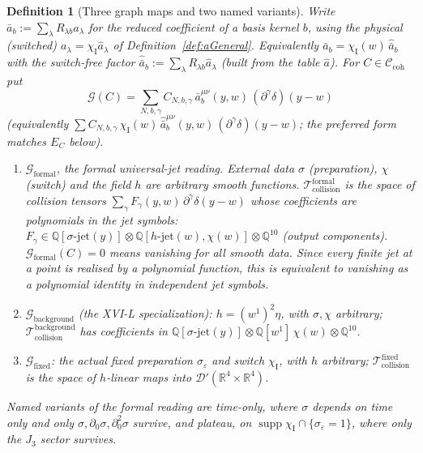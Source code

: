 \documentclass{article}
\newtheorem{definition}[proposition]{Definition}
\theoremstyle{remark}
\newcommand{\sigeps}{\sigma_\varepsilon}
\newcommand{\chiI}{\chi_{\mathrm I}}
\newcommand{\Ccoh}{\mathcal C_{\mathrm{coh}}}
\newcommand{\Tcol}{\mathcal T_{\mathrm{collision}}}
\begin{document}
\begin{definition}[Three graph maps and two named variants]
\label{def:Gmaps}
Write $\bar a_b:=\sum_\lambda R_{\lambda b}a_\lambda$ for the reduced coefficient of a basis kernel $b$, using the physical (switched) $a_\lambda=\chiI\hat a_\lambda$ of Definition~\ref{def:aGeneral}.
Equivalently $\bar a_b=\chiI(w)\,\hat{\bar a}_b$ with the switch-free factor $\hat{\bar a}_b:=\sum_\lambda R_{\lambda b}\hat a_\lambda$ (built from the table $\hat a$).
For $C\in\Ccoh$ put
\[
\mathcal G(C)=\sum_{N,b,\gamma}C_{N,b,\gamma}\,\bar a_b^{\mu\nu}(y,w)\,(\partial^\gamma\delta)(y-w)
\]
(equivalently $\sum C_{N,b,\gamma}\,\chiI(w)\,\hat{\bar a}_b^{\mu\nu}(y,w)\,(\partial^\gamma\delta)(y-w)$; the preferred form matches $E_C$ below).
\begin{enumerate}
\item $\mathcal G_{\mathrm{formal}}$, the \emph{formal universal-jet reading}.
External data $\sigma$ (preparation), $\chi$ (switch) and the field $h$ are arbitrary smooth functions.
$\Tcol^{\mathrm{formal}}$ is the space of collision tensors $\sum_\gamma F_\gamma(y,w)\,\partial^\gamma\delta(y-w)$ whose coefficients are polynomials in the jet symbols: $F_\gamma\in\mathbb Q[\sigma\text{-jet}(y)]\otimes\mathbb Q[h\text{-jet}(w),\chi(w)]\otimes\mathbb Q^{10}$ (output components).
$\mathcal G_{\mathrm{formal}}(C)=0$ means vanishing for \emph{all} smooth data.
Since every finite jet at a point is realised by a polynomial function, this is equivalent to vanishing as a polynomial identity in independent jet symbols.
\item $\mathcal G_{\mathrm{background}}$ (the XVI-L specialization): $h=(w^1)^2\eta$, with $\sigma,\chi$ arbitrary; $\Tcol^{\mathrm{background}}$ has coefficients in $\mathbb Q[\sigma\text{-jet}(y)]\otimes\mathbb Q[w^1]\,\chi(w)\otimes\mathbb Q^{10}$.
\item $\mathcal G_{\mathrm{fixed}}$: the actual fixed preparation $\sigeps$ and switch $\chiI$, with $h$ arbitrary; $\Tcol^{\mathrm{fixed}}$ is the space of $h$-linear maps into $\mathcal D'(\mathbb R^4\times\mathbb R^4)$.
\end{enumerate}
Named variants of the formal reading are \emph{time-only}, where $\sigma$ depends on time only and only $\sigma,\partial_0\sigma,\partial_0^2\sigma$ survive, and \emph{plateau}, on $\operatorname{supp}\chiI\cap\{\sigeps=1\}$, where only the $J_3$ sector survives.
\end{definition}
\end{document}

